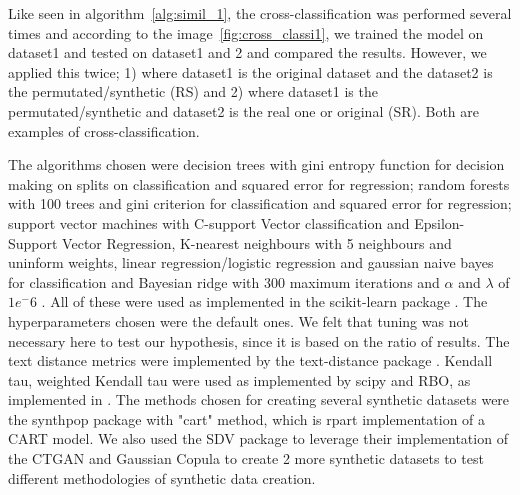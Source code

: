 Like seen in algorithm~\ref{alg:simil_1}, the cross-classification was performed several times and according to the image~\ref{fig:cross_classi1}, we trained the model on dataset1 and tested on dataset1 and 2 and compared the results. However, we applied this twice; 1) where dataset1 is the original dataset and the dataset2 is the permutated/synthetic (RS) and 2) where dataset1 is the permutated/synthetic and dataset2 is the real one or original (SR). Both are examples of cross-classification.

The algorithms chosen were decision trees with gini entropy function for decision making on splits on classification and squared error for regression; random forests with 100 trees and gini criterion for classification and squared error for regression; support vector machines with C-support Vector classification and Epsilon-Support Vector Regression, K-nearest neighbours with 5 neighbours and uninform weights, linear regression/logistic regression and gaussian naive bayes for classification and Bayesian ridge with 300 maximum iterations and $\alpha$ and $\lambda$ of $1e^-6$ . All of these were used as implemented in the scikit-learn package \cite{scikit-learn}. The hyperparameters chosen were the default ones. We felt that tuning was not necessary here to test our hypothesis, since it is based on the ratio of results.
The text distance metrics were implemented by the text-distance package \cite{orsiniumTextdistanceComputeDistance}. Kendall tau, weighted Kendall tau were used as implemented by scipy \cite{virtanenSciPyFundamentalAlgorithms2020a} and RBO, as implemented in \cite{chenRankbiasedOverlapRBO2023}.
The methods chosen for creating several synthetic datasets were the synthpop package \cite{synthpop} with "cart" method, which is rpart implementation of a CART model. We also used  the SDV package \cite{SDV} to leverage their implementation of the CTGAN and Gaussian Copula to create 2 more synthetic datasets to test different methodologies of synthetic data creation.






